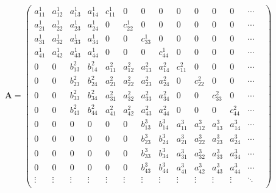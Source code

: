 \documentclass[]{article}
\newcommand{\mA}{\bm{A}}
\begin{document}
$$
	\mA =
	\left(\begin{array}{cccccccccccccc}
	a^1_{11} & a^1_{12} & a^1_{13}  & a^1_{14} & c^1_{11} & 0  & 0  & 0 & 0  & 0  & 0  & 0  & \cdots  \\
	a^1_{21} & a^1_{22} & a^1_{23}  & a^1_{24} & 0 & c^1_{22} & 0  & 0  & 0  & 0  & 0  & 0  & \cdots  \\
	a^1_{31} & a^1_{32} & a^1_{33}  & a^1_{34} & 0  & 0  &  c^1_{33} & 0 & 0  & 0  & 0  & 0  & \cdots  \\
	a^1_{41} & a^1_{42} & a^1_{43}  & a^1_{44} & 0  & 0  & 0 & c^1_{44} & 0  & 0  & 0  & 0  & \cdots   \\
	0 & 0 & b^2_{13}  & b^2_{14} & a^2_{11} & a^2_{12} & a^2_{13}  & a^2_{14} & c^2_{11} & 0  & 0  & 0 &\cdots& \\
	0 & 0 & b^2_{23}  & b^2_{24} & a^2_{21} & a^2_{22} & a^2_{23}  & a^2_{24} & 0 & c^2_{22} & 0  & 0  &\cdots &\\
	0 & 0 & b^2_{33}  & b^2_{34} & a^2_{31} & a^2_{32} & a^2_{33}  & a^2_{34} & 0  & 0  &  c^2_{33} & 0&\cdots &\\
	0 & 0 & b^2_{43}  & b^2_{44} & a^2_{41} & a^2_{42} & a^2_{43}  & a^2_{44} & 0  & 0  & 0 & c^2_{44} &\cdots &\\
	0&0&0&0&0&0& b^3_{13}  & b^3_{14} & a^3_{11} & a^3_{12} & a^3_{13}  & a^3_{14} &\cdots \\
	0&0&0&0&0&0& b^3_{23}  & b^3_{24} & a^3_{21} & a^3_{22} & a^3_{23}  & a^3_{24} &\cdots \\
	0&0&0&0&0&0& b^3_{33}  & b^3_{34} & a^3_{31} & a^3_{32} & a^3_{33}  & a^3_{34} &\cdots \\
	0&0&0&0&0&0& b^3_{43}  & b^3_{44} & a^3_{41} & a^3_{42} & a^3_{43}  & a^3_{44} &\cdots \\
	\vdots & \vdots &\vdots &\vdots &\vdots &\vdots &\vdots &\vdots &\vdots &\vdots &\vdots &\vdots & \ddots \\
	\end{array}\right)
$$
\end{document}
